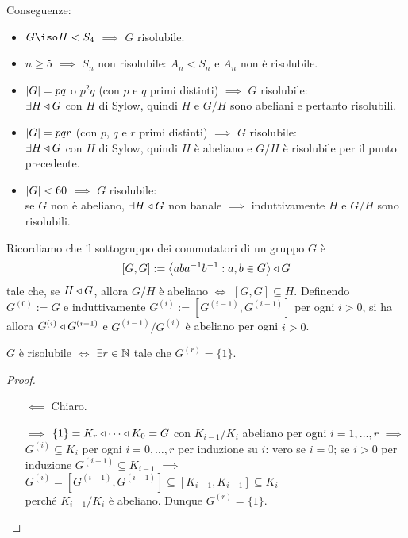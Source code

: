 Conseguenze:
\begin{itemize}
\item $G\iso H<S_4$ $\implies$ $G$ risolubile.
\item $n\ge5$ $\implies$ $S_n$ non risolubile: $A_n<S_n$ e $A_n$ non è risolubile.
\item $\left\lvert G\right\rvert=pq$ o $p^2q$ (con $p$ e $q$ primi distinti) $\implies$ $G$ risolubile: \\
$\exists H \triangleleft G$ con $H$ di Sylow, quindi $H$ e $G/H$ sono abeliani e pertanto risolubili.
\item $\left\lvert G\right\rvert=pqr$ (con $p$, $q$ e $r$ primi distinti) $\implies$ $G$ risolubile: \\
$\exists H \triangleleft G$ con $H$ di Sylow, quindi $H$ è abeliano e $G/H$ è risolubile per il punto precedente.
\item $\left\lvert G\right\rvert<60$ $\implies$ $G$ risolubile: \\
se $G$ non è abeliano, $\exists H \triangleleft G$ non banale $\implies$ induttivamente $H$ e $G/H$ sono risolubili.
\end{itemize}



Ricordiamo che il sottogruppo dei commutatori di un gruppo $G$ è
\[
[G,G]:=\left\langle aba^{-1}b^{-1} :  a,b\in G\right\rangle \triangleleft G
\]
tale che, se $H \triangleleft G$, allora $G/H$ è abeliano $\iff$ $[G,G]\subseteq H$. Definendo $G^{(0)}:=G$ e induttivamente $G^{(i)}:=[G^{(i-1)},G^{(i-1)}]$ per ogni $i>0$, si ha allora $G^{(i)} \triangleleft G^{(i-1)}$ e $G^{(i-1)}/G^{(i)}$ è abeliano per ogni $i>0$.

\begin{prop}
$G$ è risolubile $\iff$ $\exists r\in\mathbb{N}$ tale che $G^{(r)}=\{1\}$.
\end{prop}

\begin{proof}
\begin{itemize}
\item[$\impliedby$] Chiaro.
\item[$\implies$] $\{1\}=K_r \triangleleft\cdots \triangleleft K_0=G$ con $K_{i-1}/K_i$ abeliano per ogni $i=1,\dots,r$ $\implies$ $G^{(i)}\subseteq K_i$ per ogni $i=0,\dots,r$ per induzione su $i$: vero se $i=0$; se $i>0$ per induzione $G^{(i-1)}\subseteq K_{i-1}$ $\implies$ $G^{(i)}=[G^{(i-1)},G^{(i-1)}]\subseteq[K_{i-1},K_{i-1}]\subseteq K_i$ \\
perché $K_{i-1}/K_i$ è abeliano. Dunque $G^{(r)}=\{1\}$. \qedhere
\end{itemize}
\end{proof}
